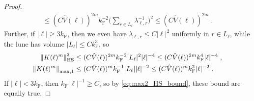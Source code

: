 \documentclass[sn-mathphys, Numbered ,a4paper]{sn-jnl}%
\newcommand{\F}{\mathrm{F}}
\theoremstyle{plain}
\theoremstyle{definition}
\theoremstyle{remark}
\theoremstyle{plain}
\theoremstyle{definition}
\theoremstyle{remark}
\begin{document}
\begin{proof}
\begin{equation}
\begin{aligned}
	\le (C \hat{V}(\ell))^{2m} k_{\F}^{-2} \Big( \sum_{r \in L_\ell}  \lambda_{\ell,r}^{-1} \Big)^2
	\le (C \hat{V}(\ell))^{2m} \;.
\end{aligned}
\end{equation}
Further, if $ |\ell| \ge 3 k_{\F} $, then we even have $ \lambda_{\ell,r} \le C |\ell|^2 $ uniformly in $ r \in L_\ell $, while the lune has volume $ |L_\ell| \le C k_{\F}^3 $, so
\begin{align}
	\norm{K(\ell)^m}_{\mathrm{HS}}^2
	&\le (C \hat{V}(\ell))^{2m} k_{\F}^{-2} |L_\ell|^2 |\ell|^{-4}
	\le (C \hat{V}(\ell))^{2m} k_{\F}^4 |\ell|^{-4} \;,\\
	\norm{K(\ell)^m}_{\mathrm{max,1}}
	&\le (C \hat{V}(\ell))^{m} k_{\F}^{-1} |L_\ell| |\ell|^{-2}
	\le (C \hat{V}(\ell))^{m} k_{\F}^2 |\ell|^{-2} \;.
\end{align}
If $ |\ell| < 3 k_{\F} $, then $ k_{\F} |\ell|^{-1} \ge C $, so by \eqref{eq:max2_HS_bound}, these bound are equally true.
\end{proof}
\end{document}
